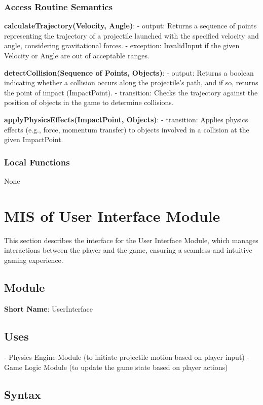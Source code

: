 \documentclass[12pt]{article}
\begin{document}
\subsubsection{Access Routine Semantics}

\textbf{calculateTrajectory(Velocity, Angle)}:
- output: Returns a sequence of points representing the trajectory of a projectile launched with the specified velocity and angle, considering gravitational forces.
- exception: InvalidInput if the given Velocity or Angle are out of acceptable ranges.

\textbf{detectCollision(Sequence of Points, Objects)}:
- output: Returns a boolean indicating whether a collision occurs along the projectile's path, and if so, returns the point of impact (ImpactPoint).
- transition: Checks the trajectory against the position of objects in the game to determine collisions.

\textbf{applyPhysicsEffects(ImpactPoint, Objects)}:
- transition: Applies physics effects (e.g., force, momentum transfer) to objects involved in a collision at the given ImpactPoint.

\subsubsection{Local Functions}

None
\section{MIS of User Interface Module}

This section describes the interface for the User Interface Module, which manages interactions between the player and the game, ensuring a seamless and intuitive gaming experience.

\subsection{Module}

\textbf{Short Name}: UserInterface

\subsection{Uses}

- Physics Engine Module (to initiate projectile motion based on player input)
- Game Logic Module (to update the game state based on player actions)

\subsection{Syntax}
\end{document}
